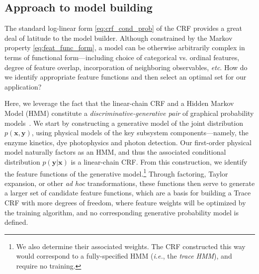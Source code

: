 \documentclass[10pt]{article}
\newcommand{\ie}{\emph{i.e.}}
\newcommand{\etc}{\emph{etc}}
\newcommand{\crf}{{\small CRF}}
\newcommand{\tcrf}{Trace {\small CRF}}
\newcommand{\hmm}{{\small HMM}}
\begin{document}
\subsection{Approach to model building}
\label{sec:principles}
The standard log-linear form \eqref{eq:crf_cond_prob} of the \crf{} provides a great deal of latitude to the model builder.
Although constrained by the Markov property \eqref{eq:feat_func_form}, a model can be otherwise arbitrarily complex in terms of functional form---including choice of categorical vs. ordinal features, degree of feature overlap, incorporation of neighboring observables, \etc.
How do we identify appropriate feature functions and then select an optimal set for our application?

Here, we leverage the fact that the linear-chain \crf{} and a Hidden Markov Model (\hmm) constitute a \emph{discriminative-generative pair} of graphical probability models~\cite{sutton_mccallum}.
We start by constructing a generative model of the joint distribution $p(\mathbf{x},\mathbf{y})$, using physical models
of the key subsystem components---namely, the enzyme kinetics, dye photophysics and photon detection.
Our first-order physical model naturally factors as an \hmm, and thus the associated conditional distribution $p(\mathbf{y}|\mathbf{x})$ is a linear-chain \crf.  
From this construction, we identify the feature functions of the generative model.\footnote{
		We also determine their associated weights.  The CRF constructed this way would correspond to a fully-specified HMM (\ie, the \emph{trace HMM}), and require no training.
}
Through factoring, Taylor expansion, or other \emph{ad hoc} transformations, these functions then serve to generate a larger set of candidate feature functions, which are a basis for building a \tcrf{} with more degrees of freedom, 
where feature weights will be optimized by the training algorithm, and no corresponding generative probability model is defined.
\end{document}
